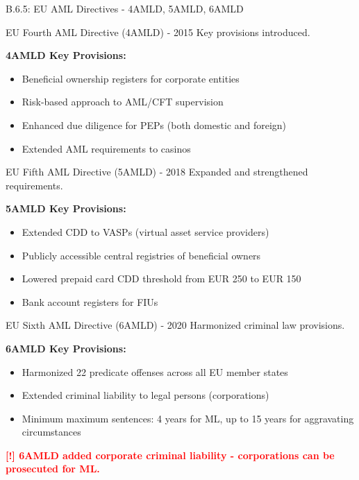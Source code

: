 \documentclass[11pt,a4paper]{beamer}
\newcommand{\redflag}[1]{\textcolor{red}{\textbf{[!] #1}}}
\begin{document}
	\begin{frame}{B.6.5: EU AML Directives - 4AMLD, 5AMLD, 6AMLD}
		\begin{block}{EU Fourth AML Directive (4AMLD) - 2015}
			Key provisions introduced.
		\end{block}
		\textbf{4AMLD Key Provisions:}
		\begin{itemize}
			\item Beneficial ownership registers for corporate entities
			\item Risk-based approach to AML/CFT supervision
			\item Enhanced due diligence for PEPs (both domestic and foreign)
			\item Extended AML requirements to casinos
		\end{itemize}
		\begin{block}{EU Fifth AML Directive (5AMLD) - 2018}
			Expanded and strengthened requirements.
		\end{block}
		\textbf{5AMLD Key Provisions:}
		\begin{itemize}
			\item Extended CDD to VASPs (virtual asset service providers)
			\item Publicly accessible central registries of beneficial owners
			\item Lowered prepaid card CDD threshold from EUR 250 to EUR 150
			\item Bank account registers for FIUs
		\end{itemize}
		\begin{block}{EU Sixth AML Directive (6AMLD) - 2020}
			Harmonized criminal law provisions.
		\end{block}
		\textbf{6AMLD Key Provisions:}
		\begin{itemize}
			\item Harmonized 22 predicate offenses across all EU member states
			\item Extended criminal liability to legal persons (corporations)
			\item Minimum maximum sentences: 4 years for ML, up to 15 years for aggravating circumstances
		\end{itemize}
		\redflag{6AMLD added corporate criminal liability - corporations can be prosecuted for ML.}
	\end{frame}
	
	
\end{document}
